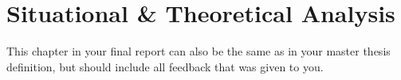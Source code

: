 \chapter{Situational \& Theoretical Analysis}\label{chap:situational_theoretical_analysis}
This chapter in your final report can also be the same as in your master thesis definition, but should include all feedback that was given to you.